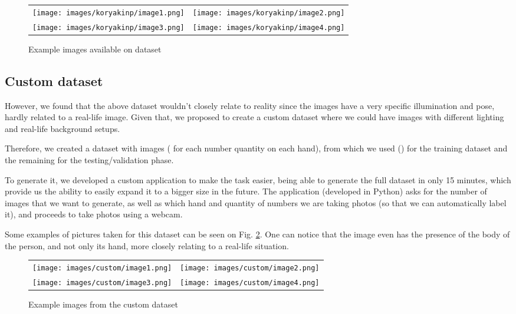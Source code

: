 \documentclass[conference]{IEEEtran}
\begin{document}
\begin{figure}
\begin{tabular}{cc}
{\texttt{[image: images/koryakinp/image1.png]}} &
{\texttt{[image: images/koryakinp/image2.png]}} \\
{\texttt{[image: images/koryakinp/image3.png]}} &
{\texttt{[image: images/koryakinp/image4.png]}}
\end{tabular}
\caption{Example images available on \cite{b7} dataset}
\label{koryakinp_fingers}
\end{figure}

\subsection{Custom dataset}
However, we found that the above dataset wouldn't closely relate to reality since the images have a very specific illumination and pose, hardly related to a real-life image. Given that, we proposed to create a custom dataset where we could have images with different lighting and real-life background setups.

Therefore, we created a dataset with  images ( for each number quantity on each hand), from which we used  () for the training dataset and the remaining  for the testing/validation phase.

To generate it, we developed a custom application to make the task easier, being able to generate the full dataset in only 15 minutes, which provide us the ability to easily expand it to a bigger size in the future. The application (developed in Python) asks for the number of images that we want to generate, as well as which hand and quantity of numbers we are taking photos (so that we can automatically label it), and proceeds to take photos using a webcam.

Some examples of pictures taken for this dataset can be seen on Fig. \ref{custom_fingers}. One can notice that the image even has the presence of the body of the person, and not only its hand, more closely relating to a real-life situation. 

\begin{figure}
\begin{tabular}{cc}
{\texttt{[image: images/custom/image1.png]}} &
{\texttt{[image: images/custom/image2.png]}} \\
{\texttt{[image: images/custom/image3.png]}} &
{\texttt{[image: images/custom/image4.png]}}
\end{tabular}
\caption{Example images from the custom dataset}
\label{custom_fingers}
\end{figure}
\end{document}
